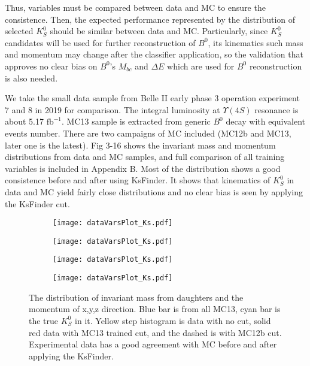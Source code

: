  Thus, variables must be compared between data and MC to ensure the consistence. Then, the expected performance represented by the distribution of selected $K_S^0$ should be similar between data and MC. Particularly, since $K_S^0$ candidates will be used for further reconstruction of $B^0$, its kinematics such mass and momentum may change after the classifier application, so the validation that approves no clear bias on $B^0$'s $M_{bc}$ and $\Delta E$ which are used for $B^0$ reconstruction is also needed.

We take the small data sample from Belle II early phase 3 operation experiment 7 and 8 in 2019 for comparison. The integral luminosity at $\Upsilon(4S)$ resonance is about 5.17 $\text{fb}^{-1}$.  MC13 sample is extracted from generic $B^0$ decay with equivalent events number. There are two campaigns of MC included (MC12b and MC13, later one is the latest). Fig 3-16 shows the invariant mass and momentum distributions from data and MC samples, and full comparison of all training variables is included in Appendix B. Most of the distribution shows a good consistence before and after using KsFinder. It shows that kinematics of $K_S^0$ in data and MC yield fairly close distributions and no clear bias is seen by applying the KsFinder cut.

\begin{figure}[H]
	\begin{subfigure}{0.5\linewidth}
		\texttt{[image: dataVarsPlot\_Ks.pdf]}
	\end{subfigure}
	\begin{subfigure}{0.5\linewidth}
		\texttt{[image: dataVarsPlot\_Ks.pdf]}
	\end{subfigure}
	\bigskip
	\begin{subfigure}{0.5\linewidth}
		\texttt{[image: dataVarsPlot\_Ks.pdf]}
	\end{subfigure}
	\begin{subfigure}{0.5\linewidth}
		\texttt{[image: dataVarsPlot\_Ks.pdf]}
	\end{subfigure}
\caption{The distribution of invariant mass from daughters and the momentum of x,y,z direction. Blue bar is from all MC13, cyan bar is the true $K_S^0$ in it. Yellow step histogram is data with no cut, solid red data with MC13 trained cut, and the dashed is with MC12b cut. Experimental data has a good agreement with MC before and after applying the KsFinder.}
\end{figure}

